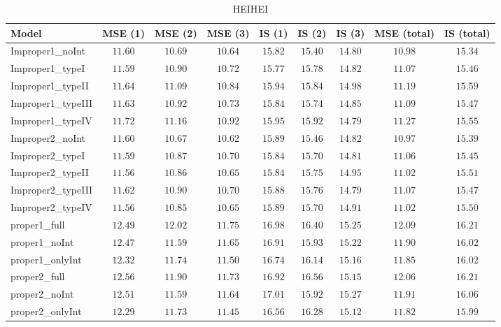 \begin{table}

\caption{\label{tab:model-choice-sc1}HEIHEI}
\centering
\begin{tabular}{lcccccccc}
\hline
Model  & MSE (1) & MSE (2) & MSE (3) & IS (1) & IS (2) & IS (3) & MSE (total) & \multicolumn{1}{c}{IS (total)} \\ 
\hline
Improper1_noInt  & $11.60$ & $10.69$ & $10.64$ & $15.82$ & $15.40$ & $14.80$ & $10.98$ & $15.34$ \\
Improper1_typeI  & $11.59$ & $10.90$ & $10.72$ & $15.77$ & $15.78$ & $14.82$ & $11.07$ & $15.46$ \\
Improper1_typeII  & $11.64$ & $11.09$ & $10.84$ & $15.94$ & $15.84$ & $14.98$ & $11.19$ & $15.59$ \\
Improper1_typeIII  & $11.63$ & $10.92$ & $10.73$ & $15.84$ & $15.74$ & $14.85$ & $11.09$ & $15.47$ \\
Improper1_typeIV  & $11.72$ & $11.16$ & $10.92$ & $15.95$ & $15.92$ & $14.79$ & $11.27$ & $15.55$ \\
Improper2_noInt  & $11.60$ & $10.67$ & $10.62$ & $15.89$ & $15.46$ & $14.82$ & $10.97$ & $15.39$ \\
Improper2_typeI  & $11.59$ & $10.87$ & $10.70$ & $15.84$ & $15.70$ & $14.81$ & $11.06$ & $15.45$ \\
Improper2_typeII  & $11.56$ & $10.86$ & $10.65$ & $15.84$ & $15.75$ & $14.95$ & $11.02$ & $15.51$ \\
Improper2_typeIII  & $11.62$ & $10.90$ & $10.70$ & $15.88$ & $15.76$ & $14.79$ & $11.07$ & $15.47$ \\
Improper2_typeIV  & $11.56$ & $10.85$ & $10.65$ & $15.89$ & $15.70$ & $14.91$ & $11.02$ & $15.50$ \\
proper1_full  & $12.49$ & $12.02$ & $11.75$ & $16.98$ & $16.40$ & $15.25$ & $12.09$ & $16.21$ \\
proper1_noInt  & $12.47$ & $11.59$ & $11.65$ & $16.91$ & $15.93$ & $15.22$ & $11.90$ & $16.02$ \\
proper1_onlyInt  & $12.32$ & $11.74$ & $11.50$ & $16.74$ & $16.14$ & $15.16$ & $11.85$ & $16.02$ \\
proper2_full  & $12.56$ & $11.90$ & $11.73$ & $16.92$ & $16.56$ & $15.15$ & $12.06$ & $16.21$ \\
proper2_noInt  & $12.51$ & $11.59$ & $11.64$ & $17.01$ & $15.92$ & $15.27$ & $11.91$ & $16.06$ \\
proper2_onlyInt  & $12.29$ & $11.73$ & $11.45$ & $16.56$ & $16.28$ & $15.12$ & $11.82$ & $15.99$ \\
\hline 
\end{tabular}


\end{table}
